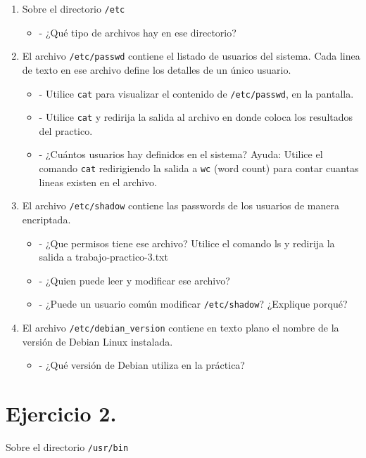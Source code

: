 \documentclass[12pt]{article}
\begin{document}
\begin{enumerate}
\item Sobre el directorio \texttt{/etc}
\begin{itemize}
\item - ¿Qué tipo de archivos hay en ese directorio?
\end{itemize}

\item El archivo \texttt{/etc/passwd} contiene el listado de usuarios del sistema.
Cada linea de texto en ese archivo define los detalles de un único usuario.

\begin{itemize}
\item - Utilice \texttt{cat} para visualizar el contenido de \texttt{/etc/passwd}, en la pantalla.
\item - Utilice \texttt{cat} y redirija la salida al archivo en donde coloca los resultados del practico.
\item - ¿Cuántos usuarios hay definidos en el sistema?
Ayuda: Utilice el comando \texttt{cat} redirigiendo la salida a \texttt{wc} (word count) para contar cuantas lineas
existen en el archivo.
\end{itemize}


\item El archivo \texttt{/etc/shadow} contiene las passwords de los usuarios de manera encriptada.
\begin{itemize}
\item - ¿Que permisos tiene ese archivo? Utilice el comando ls y redirija la salida a trabajo-practico-3.txt
\item - ¿Quien puede leer y modificar ese archivo?
\item - ¿Puede un usuario común modificar \texttt{/etc/shadow}? ¿Explique porqué?
\end{itemize}


\item El archivo \texttt{/etc/debian\_version} contiene en texto plano el nombre de la
versión de Debian Linux instalada.
\begin{itemize}
\item - ¿Qué versión de Debian utiliza en la práctica?
\end{itemize}
\end{enumerate}


\section{Ejercicio 2.}
Sobre el directorio \texttt{/usr/bin}
\end{document}
